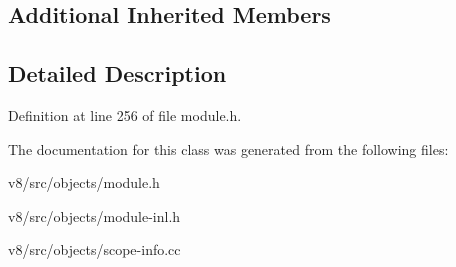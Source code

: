 \subsection*{Additional Inherited Members}


\subsection{Detailed Description}


Definition at line 256 of file module.\+h.



The documentation for this class was generated from the following files\+:\begin{DoxyCompactItemize}
\item 
v8/src/objects/module.\+h\item 
v8/src/objects/module-\/inl.\+h\item 
v8/src/objects/scope-\/info.\+cc\end{DoxyCompactItemize}
